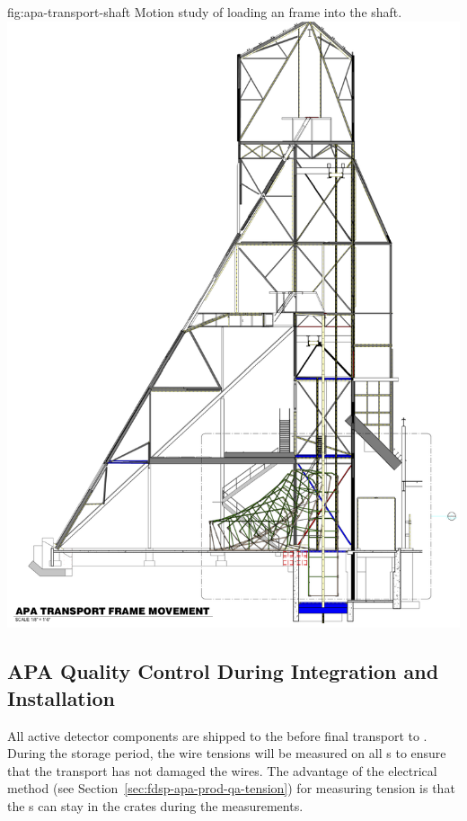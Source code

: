 \begin{dunefigure}{fig:apa-transport-shaft}
{Motion study of loading an  frame into the shaft.}  
\includegraphics[height=0.9\textheight,trim = 0mm 0mm 0mm 0mm, clip]{graphics/sp-apa-transport-shaft.png} 
\end{dunefigure}

\subsection{APA Quality Control During Integration and Installation} 
\label{sec:fdsp-apa-transport-qc}

All active detector components are shipped to the  before final transport to . During the storage period, the wire tensions will be measured on all s to ensure that the transport has not damaged the wires.  The advantage of the electrical method (see Section~\ref{sec:fdsp-apa-prod-qa-tension}) for measuring tension is that the s can stay in the crates during the measurements. 




